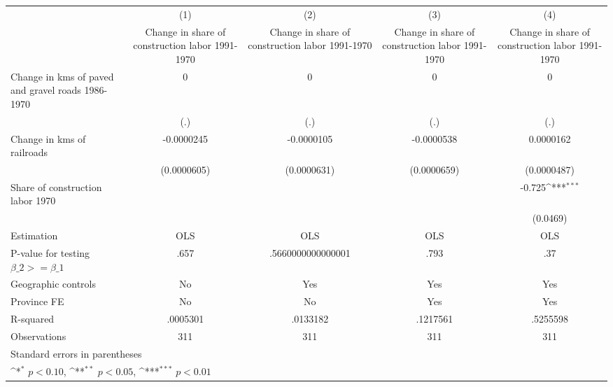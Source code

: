 {
\def\sym#1{\ifmmode^{#1}\else\(^{#1}\)\fi}
\begin{tabular}{l*{4}{c}}
\hline\hline
                    &\multicolumn{1}{c}{(1)}&\multicolumn{1}{c}{(2)}&\multicolumn{1}{c}{(3)}&\multicolumn{1}{c}{(4)}\\
                    &\multicolumn{1}{c}{Change in share of construction labor 1991-1970}&\multicolumn{1}{c}{Change in share of construction labor 1991-1970}&\multicolumn{1}{c}{Change in share of construction labor 1991-1970}&\multicolumn{1}{c}{Change in share of construction labor 1991-1970}\\
\hline
Change in kms of paved and gravel roads 1986-1970&           0         &           0         &           0         &           0         \\
                    &         (.)         &         (.)         &         (.)         &         (.)         \\
[1em]
Change in kms of railroads&  -0.0000245         &  -0.0000105         &  -0.0000538         &   0.0000162         \\
                    & (0.0000605)         & (0.0000631)         & (0.0000659)         & (0.0000487)         \\
[1em]
Share of construction labor 1970&                     &                     &                     &      -0.725\sym{***}\\
                    &                     &                     &                     &    (0.0469)         \\
\hline
Estimation          &         OLS         &         OLS         &         OLS         &         OLS         \\
P-value for testing $\beta\_2 >= \beta\_1$&        .657         &.5660000000000001         &        .793         &         .37         \\
Geographic controls &          No         &         Yes         &         Yes         &         Yes         \\
Province FE         &          No         &          No         &         Yes         &         Yes         \\
R-squared           &    .0005301         &    .0133182         &    .1217561         &    .5255598         \\
Observations        &         311         &         311         &         311         &         311         \\
\hline\hline
\multicolumn{5}{l}{\footnotesize Standard errors in parentheses}\\
\multicolumn{5}{l}{\footnotesize \sym{*} \(p<0.10\), \sym{**} \(p<0.05\), \sym{***} \(p<0.01\)}\\
\end{tabular}
}
